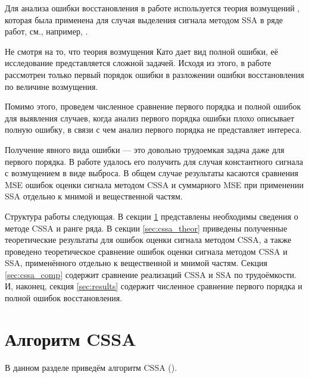 \documentclass[12pt,a4paper]{article}
\begin{document}
Для анализа ошибки восстановления в работе используется теория возмущений \cite{Kato}, которая была применена для случая выделения сигнала методом SSA в ряде работ, см., например, \cite{Nekrutkin}.

Не смотря на то, что теория возмущения Като дает вид полной ошибки, её исследование представляется сложной задачей. Исходя из этого, в работе рассмотрен только первый порядок ошибки в разложении ошибки восстановления по величине возмущения.

Помимо этого, проведем численное сравнение первого порядка и полной ошибок для выявления случаев, когда анализ первого порядка ошибки плохо описывает полную ошибку, в связи с чем анализ первого порядка не представляет интереса.

Получение явного вида ошибки --- это довольно трудоемкая задача даже для первого порядка. В работе удалось его получить для случая константного сигнала с возмущением в виде выброса. В общем случае результаты касаются сравнения MSE ошибок оценки сигнала методом CSSA и суммарного MSE при применении SSA отдельно к мнимой и вещественной частям.

Структура работы следующая. В секции \ref{sec:basessa} представлены необходимы сведения о методе CSSA и ранге ряда. В секции \ref{sec:cssa_theor} приведены полученные теоретические результаты для ошибок оценки сигнала методом CSSA, а также проведено теоретическое сравнение ошибок оценки сигнала методом CSSA и SSA, применённого отдельно к вещественной и мнимой частям. Секция \ref{sec:cssa_comp} содержит сравнение реализаций CSSA и SSA по трудоёмкости. И, наконец, секция \ref{sec:results} содержит численное сравнение первого порядка и полной ошибок восстановления.



\section{Алгоритм CSSA}
\label{sec:basessa}

В данном разделе приведём алгоритм CSSA (\cite{Golyandina.etal2001}).
\end{document}
